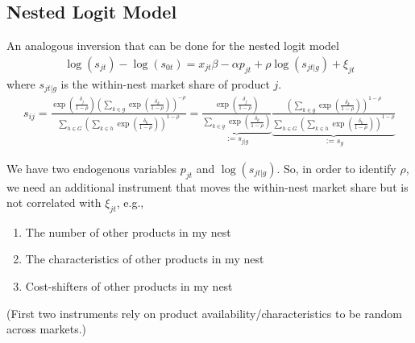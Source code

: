 \documentclass[11pt]{elegantbook}
\begin{document}
\subsection{Nested Logit Model}
An analogous inversion that can be done for the nested logit model
\begin{equation}
    \begin{aligned}
        \log(s_{jt})-\log(s_{0t})=x_{jt}\beta-\alpha p_{jt}+\rho\log\left(s_{jt|g}\right)+\xi_{jt}
    \end{aligned}
    \nonumber
\end{equation}
where $s_{jt|g}$ is the within-nest market share of product $j$.
\begin{equation}
    \begin{aligned}
        s_{ij}=\frac{\exp\left(\frac{\delta_{j}}{1-\rho}\right)\left(\sum_{k\in g}\exp\left(\frac{\delta_{k}}{1-\rho}\right)\right)^{-\rho}}{\sum_{h \in G}\left(\sum_{k\in h}\exp\left(\frac{\delta_{k}}{1-\rho}\right)\right)^{1-\rho}}=\underbrace{\frac{\exp\left(\frac{\delta_{j}}{1-\rho}\right)}{\sum_{k\in g}\exp\left(\frac{\delta_{k}}{1-\rho}\right)}}_{:=s_{j|g}}\underbrace{\frac{\left(\sum_{k\in g}\exp\left(\frac{\delta_{k}}{1-\rho}\right)\right)^{1-\rho}}{\sum_{h\in G}\left(\sum_{k\in h}\exp\left(\frac{\delta_{k}}{1-\rho}\right)\right)^{1-\rho}}}_{:=s_{g}}
    \end{aligned}
    \nonumber
\end{equation}

We have two endogenous variables $p_{jt}$ and $\log\left(s_{jt|g}\right)$. So, in order to identify $\rho$, we need an additional instrument that moves the within-nest market share but is not correlated with $\xi_{jt}$, e.g.,
\begin{enumerate}
    \item The number of other products in my nest
    \item  The characteristics of other products in my nest
    \item Cost-shifters of other products in my nest
\end{enumerate}
(First two instruments rely on product availability/characteristics to be random across markets.)
\end{document}
